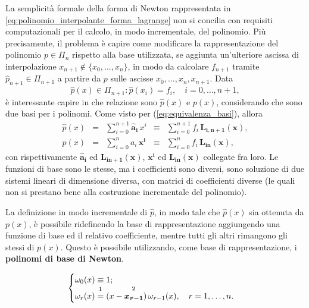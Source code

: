 
La semplicità formale della forma di Newton rappresentata in \ref{eq:polinomio_interpolante_forma_lagrange} non si concilia con requisiti computazionali per il calcolo, in modo incrementale, del polinomio. Più precisamente, il problema è capire come modificare la rappresentazione del polinomio $p\in\Pi_n$ rispetto alla base utilizzata, se aggiunta un'ulteriore ascissa di interpolazione $x_{n+1}\notin\{x_0,\hdots,x_n\}$, in modo da calcolare $f_{n+1}$ tramite $\widehat{p}_{n+1}\in\Pi_{n+1}$ a partire da $p$ sulle ascisse $x_0,\hdots,x_n, x_{n+1}$. Data
\begin{equation*}
	\widehat{p}(x)\in\Pi_{n+1}:\widehat{p}(x_i)=f_i,\quad i=0,\hdots,n+1,
\end{equation*}
è interessante capire in che relazione sono $\widehat{p}(x)$ e $p(x)$, considerando che sono due basi per i polinomi. Come visto per (\ref{eq:equivalenza_basi}), allora
\begin{equation}
    \begin{matrix}
         \widehat{p}(x)&=&\sum_{i=0}^{n+1}\boldsymbol{\widehat{a}_i}\, x^i&\equiv&\sum_{i=0}^{n+1} f_i\, \boldsymbol{L_{i,n+1}(x)},\\
        p(x)&=&\sum_{i=0}^n a_i\,\boldsymbol{x^i}&\equiv&\sum_{i=0}^n f_i\, \boldsymbol{L_{in}(x)},
    \end{matrix}
\end{equation}
con rispettivamente $\boldsymbol{\widehat{a}_i}$ ed $\boldsymbol{L_{in+1}(x)}$, $\boldsymbol{x^i}$ ed $\boldsymbol{L_{in}(x)}$ collegate fra loro.
Le funzioni di base sono le stesse, ma i coefficienti sono diversi, sono soluzione di due sistemi lineari di dimensione diversa, con matrici di coefficienti diverse (le quali non si prestano bene alla costruzione incrementale del polinomio). 

La definizione in modo incrementale di $\widehat{p}$, in modo tale che $\widehat p(x)$ sia ottenuta da $p(x)$, è possibile ridefinendo la base di  rappresentazione aggiungendo una funzione di base ed il relativo coefficiente, mentre tutti gli altri rimangono gli stessi di $p(x)$. Questo è possibile utilizzando, come base di rappresentazione, i \textbf{polinomi di base di Newton}.

\begin{definition}
	\begin{equation}\label{eq:polinomio_base_newton}
	    \begin{cases}
	        \omega_0(x)\equiv 1;\\
			\omega_r(x)\overset{\footnotemark}{=}(x-\overset{\footnotemark}{\boldsymbol{x_{r-1}}})\,\omega_{r-1}(x),\quad r=1,\hdots,n.
	    \end{cases}
	\end{equation}
\end{definition}
\addtocounter{footnote}{-1}


